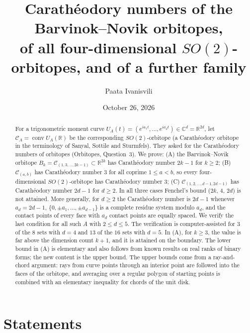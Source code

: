 \documentclass[11pt]{amsart}
\title[Carath\'eodory numbers of $SO(2)$-orbitopes]{Carath\'eodory numbers of the Barvinok--Novik orbitopes,\\ of all four-dimensional $SO(2)$-orbitopes, and of a further family}
\author{Paata Ivanisvili}
\date{October 26, 2026}
\theoremstyle{remark}
\newcommand{\R}{\mathbb{R}}
\newcommand{\C}{\mathbb{C}}
\newcommand{\conv}{\operatorname{conv}}
\begin{document}
\begin{abstract}
For a trigonometric moment curve $U_A(t)=(e^{ia_1t},\dots,e^{ia_dt})\in\C^d=\R^{2d}$, let $\mathcal C_A=\conv U_A(\R)$ be the
corresponding $SO(2)$-orbitope (a Carath\'eodory orbitope in the terminology of Sanyal, Sottile and Sturmfels). They asked for the Carath\'eodory
numbers of orbitopes (Orbitopes, Question~3). We prove:
(A) the Barvinok--Novik orbitope $B_k=\mathcal C_{(1,3,\dots,2k-1)}\subset\R^{2k}$ has Carath\'eodory number $2k-1$ for $k\ge2$;
(B) $\mathcal C_{(a,b)}$ has Carath\'eodory number $3$ for all coprime $1\le a<b$, so every four-dimensional $SO(2)$-orbitope has
Carath\'eodory number $3$; (C) $\mathcal C_{(1,2,\dots,d-1,2d-1)}$ has Carath\'eodory number $2d-1$ for $d\ge2$. In all three cases Fenchel's bound ($2k$, $4$, $2d$) is not attained.
More generally, for $d\ge2$ the Carath\'eodory number is $2d-1$ whenever $a_d=2d-1$, $\{0,\pm a_1,\dots,\pm a_{d-1}\}$ is a complete residue system modulo $a_d$,
and the contact points of every face with $a_d$ contact points are equally spaced. We verify the last condition for all such $A$ with $2\le d\le5$. The
verification is computer-assisted for $3$ of the $8$ sets with $d=4$ and $13$ of the $16$ sets with $d=5$. In (A), for $k\ge3$, the value is far above the
dimension count $k+1$, and it is attained on the boundary. The lower bound in (A) is elementary and also follows from known results on real ranks of binary
forms; the new content is the upper bound. The upper bounds come from a ray-and-chord argument: rays from curve points through
an interior point are followed into the faces of the orbitope, and averaging over a regular polygon of starting points is combined with
an elementary inequality for chords of the unit disk.
\end{abstract}
\makeatletter
\let\aidisc@setabstracta\@setabstracta
\def\@setabstracta{\par\vskip 10pt{\centering\small\itshape
This proof was generated on October 27, 2026, by Grok Bot using Cursor’s agents, guided by several prompts from Paata Ivanisvili
\par}\aidisc@setabstracta}
\makeatother
\maketitle

\section{Statements}
\end{document}
